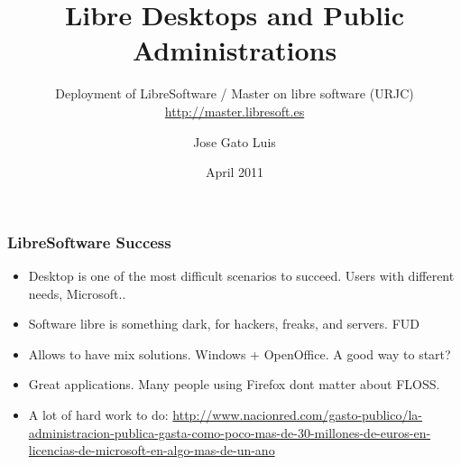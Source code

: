 \documentclass{beamer}
\begin{document}
\title{Libre Desktops and Public Administrations}
\subtitle{ Deployment of LibreSoftware / Master on libre software (URJC) \\
\url{http://master.libresoft.es}}
\author{Jose Gato Luis}

\date{April 2011}







\begin{frame}
\frametitle{LibreSoftware Success }

\begin{itemize}
\item Desktop is one of the most difficult scenarios to succeed. Users with different needs, Microsoft..
\item Software libre is something dark, for hackers, freaks, and servers. FUD
\item Allows to have mix solutions. Windows + OpenOffice. A good way to start?
\item Great applications. Many people using Firefox dont matter about FLOSS.
\item A lot of hard work to do: \url{http://www.nacionred.com/gasto-publico/la-administracion-publica-gasta-como-poco-mas-de-30-millones-de-euros-en-licencias-de-microsoft-en-algo-mas-de-un-ano}

\end{itemize}

\end{frame}
\end{document}
